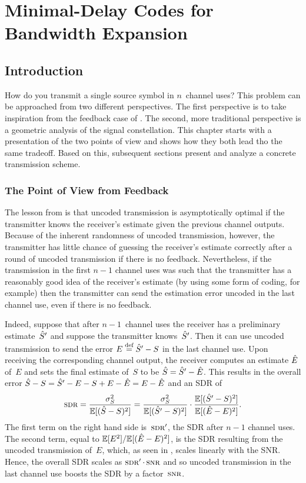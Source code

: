 \chapter{Minimal-Delay Codes for Bandwidth Expansion}\label{ch:mindelbwex}

\section{Introduction}\label{sec:mindelintro}

How do you transmit a single source symbol in $n$~channel uses? This problem can
be approached from two different perspectives.  The first perspective is to take
inspiration from the feedback case of . The second, more
traditional perspective is a geometric analysis of the signal constellation.
This chapter starts with a presentation of the two points of view and shows how
they both lead tho the same tradeoff. Based on this, subsequent sections present
and analyze a concrete transmission scheme. 


\subsection{The Point of View from Feedback}

The lesson from  is that uncoded transmission is asymptotically
optimal if the transmitter knows the receiver's estimate given the previous
channel outputs.  Because of the inherent randomness of uncoded transmission,
however, the transmitter has little chance of guessing the receiver's estimate
correctly after a round of uncoded transmission if there is no feedback.
Nevertheless, if the transmission in the first $n-1$ channel uses was such that
the transmitter has a reasonably good idea of the receiver's estimate (by using
some form of coding, for example) then the transmitter can send the estimation
error uncoded in the last channel use, even if there is no feedback. 

Indeed, suppose that after $n-1$~channel uses the receiver has a preliminary
estimate~${\hat{S}}'$ and suppose the transmitter knows~${\hat{S}}'$. Then it 
can use uncoded transmission to send the error $E \stackrel{\text{def}}{=} {\hat{S}}' - S$ in the last
channel use. Upon receiving the corresponding channel output, the receiver
computes an estimate $\hat{E}$ of~$E$ and sets the final estimate of~$S$ to be ${\hat{S}}
= {\hat{S}}' - \hat{E}$. This results in the overall error ${\hat{S}} - S = {\hat{S}}' - E - S + E -
\hat{E} = E - \hat{E}$ and an SDR of
\begin{equation*}
  \sdr = \frac{\ssq}{\mse} = \frac{\ssq}{\E[(\Sh' - S)^2]} \cdot
  \frac{\E[(\Sh' - S)^2]}{\msee}.
\end{equation*}
The first term on the right hand side is~$\sdr'$, the SDR after $n-1$ channel
uses. The second term, equal to $\mathbb{E}[E^2]/{\mathbb{E}[(\hat{E} - E)^2]}$, is the SDR resulting from the
uncoded transmission of~$E$, which, as seen in , scales
linearly with the SNR. Hence, the overall SDR scales as $\sdr' \cdot \snr$ and
so uncoded transmission in the last channel use boosts the SDR by a
factor~$\snr$. 

